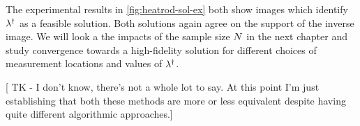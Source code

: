 The experimental results in \ref{fig:heatrod-sol-ex} both show images which identify $\lambda^\dagger$ as a feasible solution.
Both solutions again agree on the support of the inverse image.
We will look a the impacts of the sample size $N$ in the next chapter and study convergence towards a high-fidelity solution for different choices of measurement locations and values of $\lambda^\dagger$.

[ TK - I don't know, there's not a whole lot to say. At this point I'm just establishing that both these methods are more or less equivalent despite having quite different algorithmic approaches.]
